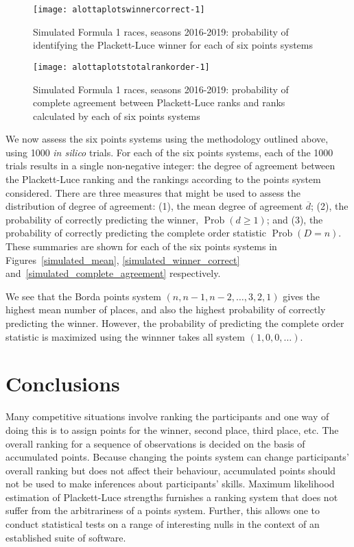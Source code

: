 \documentclass[a4,12pt]{article}
\begin{document}
\begin{figure}
{\centering \texttt{[image: alottaplotswinnercorrect-1]} }
\caption[\doublespacing Simulated Formula 1 races, seasons
  2016-2019]{\doublespacing Simulated Formula 1 races, seasons
  2016-2019: probability of identifying the Plackett-Luce winner for
  each of six points \label{simulated_winner_correct}
  systems}\label{fig:alottaplotswinnercorrect}
\end{figure}

\begin{figure}
{\centering \texttt{[image: alottaplotstotalrankorder-1]}}
\caption[\doublespacing Simulated Formula 1 races, seasons
  2016-2019]{\doublespacing Simulated Formula 1 races, seasons
  2016-2019: probability of complete agreement between Plackett-Luce
  ranks and ranks calculated by each of six
  points \label{simulated_complete_agreement}
  systems}\label{fig:alottaplotstotalrankorder}
\end{figure}

We now assess the six points systems using the methodology outlined
above, using 1000 \emph{in silico} trials.  For each of the six points
systems, each of the 1000 trials results in a single non-negative
integer: the degree of agreement between the Plackett-Luce ranking and
the rankings according to the points system considered.  There are
three measures that might be used to assess the distribution of degree
of agreement: (1), the mean degree of agreement \(\overline{d}\); (2),
the probability of correctly predicting the winner,
$\operatorname{Prob}(d\geq 1)$; and (3), the probability of correctly
predicting the complete order statistic $\operatorname{Prob}(D=n)$.
These summaries are shown for each of the six points systems in
Figures~\ref{simulated_mean}, \ref{simulated_winner_correct}
and~\ref{simulated_complete_agreement} respectively.

We see that the Borda points system $(n,n-1,n-2,\ldots,3,2,1)$ gives
the highest mean number of places, and also the highest probability of
correctly predicting the winner.  However, the probability of predicting
the complete order statistic is maximized using the winnner takes all
system \((1,0,0,\ldots)\).

\section{\centering Conclusions}

Many competitive situations involve ranking the participants and one
way of doing this is to assign points for the winner, second place,
third place, etc.  The overall ranking for a sequence of observations
is decided on the basis of accumulated points.  Because changing the
points system can change participants' overall ranking but does not
affect their behaviour, accumulated points should not be used to make
inferences about participants' skills.  Maximum likelihood estimation
of Plackett-Luce strengths furnishes a ranking system that does not
suffer from the arbitrariness of a points system.  Further, this
allows one to conduct statistical tests on a range of interesting
nulls in the context of an established suite of software.
\end{document}
